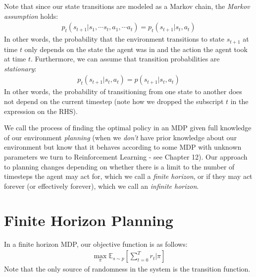 Note that since our state transitions are modeled as a Markov chain, the \textit{Markov assumption} holds:
\begin{align*}
    p_t(s_{t + 1}|s_1, \cdots s_t, a_1, \cdots a_t) = p_t(s_{t + 1}|s_t, a_t)
\end{align*}
In other words, the probability that the environment transitions to state $s_{t + 1}$ at time $t$ only depends on the state the agent was in and the action the agent took at time $t$. Furthermore, we can assume that transition probabilities are \textit{stationary}:
\begin{align*}
p_{t}(s_{t + 1}|s_t, a_t) = p(s_{t + 1}|s_t, a_t)
\end{align*}
In other words, the probability of transitioning from one state to another does not depend on the current timestep (note how we dropped the subscript $t$ in the expression on the RHS).

We call the process of finding the optimal policy in an MDP given full knowledge of our environment \textit{planning} (when we \textit{don't} have prior knowledge about our environment but know that it behaves according to some MDP with unknown parameters we turn to Reinforcement Learning - see Chapter 12). Our approach to planning changes depending on whether there is a limit to the number of timesteps the agent may act for, which we call a \textit{finite horizon}, or if they may act forever (or effectively forever), which we call an \textit{infinite horizon}.

\section{Finite Horizon Planning}
In a finite horizon MDP, our objective function is as follows:
\begin{align*}
\max_{\pi} \mathbb{E}_{s\sim p}\left[\sum_{t=0}^Tr_t|\pi\right]
\end{align*}
Note that the only source of randomness in the system is the transition function.\\

